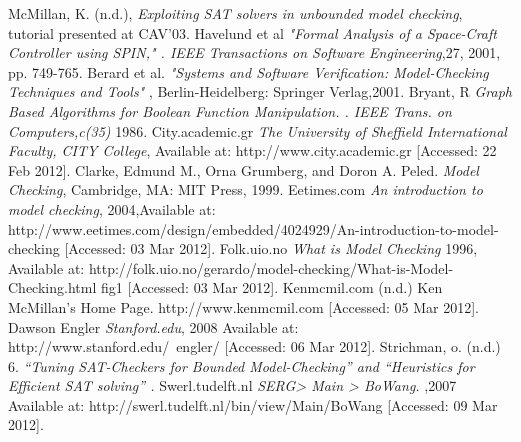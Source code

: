 \documentclass{article}
\begin{document}
\begin{thebibliography}{}
 McMillan, K. (n.d.), \emph{Exploiting SAT solvers in unbounded model checking}, tutorial presented at CAV'03.
 Havelund et al \emph{"Formal Analysis of a Space-Craft Controller using SPIN," . IEEE Transactions on Software Engineering},27, 2001, pp. 749-765.
 Berard et al. \emph{"Systems and Software Verification: Model-Checking Techniques and Tools"} , Berlin-Heidelberg: Springer Verlag,2001.
 Bryant, R \emph{Graph Based Algorithms for Boolean Function Manipulation. . IEEE Trans. on Computers,c(35)} 1986.
 City.academic.gr \emph{The University of Sheffield International Faculty, CITY College}, Available at: http://www.city.academic.gr [Accessed: 22 Feb 2012].
\bibitem{ }
Clarke, Edmund M., Orna Grumberg, and Doron A. Peled. \emph{Model Checking}, Cambridge, MA: MIT Press, 1999.
 Eetimes.com \emph{An introduction to model checking}, 2004,Available at: http://www.eetimes.com/design/embedded/4024929/An-introduction-to-model-checking [Accessed: 03 Mar 2012].
 Folk.uio.no \emph{What is Model Checking} 1996, Available at: http://folk.uio.no/gerardo/model-checking/What-is-Model-Checking.html fig1 [Accessed: 03 Mar 2012].
 Kenmcmil.com (n.d.) Ken McMillan's Home Page. http://www.kenmcmil.com [Accessed: 05 Mar 2012].
 Dawson Engler \emph{Stanford.edu}, 2008 Available at: http://www.stanford.edu/~engler/ [Accessed: 06 Mar 2012].
 Strichman, o. (n.d.) 6.  \emph{“Tuning SAT-Checkers for Bounded Model-Checking” and “Heuristics for Efficient SAT solving” .}
 Swerl.tudelft.nl \emph{SERG> Main > BoWang.} ,2007 Available at: http://swerl.tudelft.nl/bin/view/Main/BoWang [Accessed: 09 Mar 2012].




\end{thebibliography}
\end{document}
